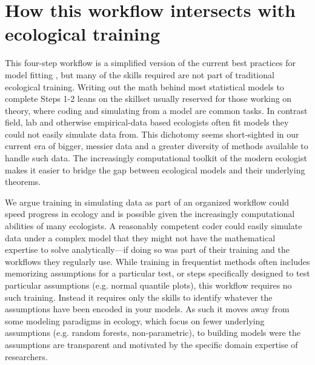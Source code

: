 \documentclass[11pt]{article}
\begin{document}
\section*{How this workflow intersects with ecological training} %

This four-step workflow is a simplified version of the current best practices for model fitting  \citep{betanworkflow,vandeschoot2021}, but many of the skills required are not part of traditional ecological training. Writing out the math behind most statistical models to complete Steps 1-2 leans on the skillset usually reserved for those working on theory, where coding and simulating from a model are common tasks. In contrast field, lab and otherwise empirical-data based ecologists often fit models they could not easily simulate data from. This dichotomy seems short-sighted in our current era of bigger, messier data and a greater diversity of methods available to handle such data. The increasingly computational toolkit of the modern ecologist makes it easier to bridge the gap between ecological models and their underlying theorems. 

We argue training in simulating data as part of an organized workflow could speed progress in ecology and is possible given the increasingly computational abilities of many ecologists. A reasonably competent coder could easily simulate data under a complex model that they might not have the mathematical expertise to solve analytically---if doing so was part of their training and the workflows they regularly use. While training in frequentist methods often includes memorizing assumptions for a particular test, or steps specifically designed to test particular assumptions (e.g. normal quantile plots), this workflow requires no such training. Instead it requires only the skills to identify whatever the assumptions have been encoded in your models. As such it moves away from some modeling paradigms in ecology, which focus on fewer underlying assumptions (e.g. random forests, non-parametric), to building models were the assumptions are transparent and motivated by the specific domain expertise of researchers. %
\end{document}
